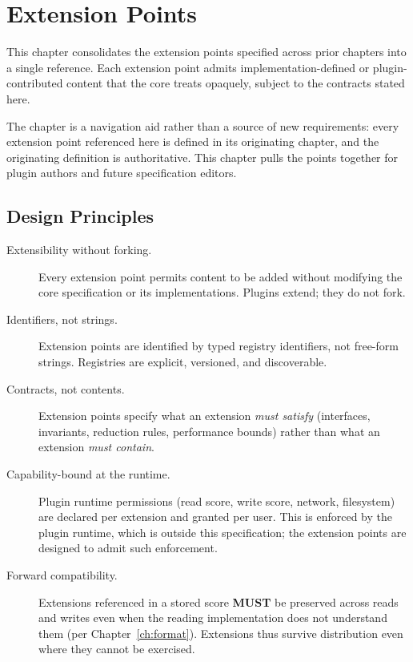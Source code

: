 \documentclass[11pt,letterpaper]{report}
\newcounter{requirement}[chapter]
\newcommand{\MUST}{\textbf{MUST}}
\begin{document}
\chapter{Extension Points}
\label{ch:extension}

This chapter consolidates the extension points specified across
prior chapters into a single reference. Each extension point admits
implementation-defined or plugin-contributed content that the core
treats opaquely, subject to the contracts stated here.

The chapter is a navigation aid rather than a source of new
requirements: every extension point referenced here is defined in
its originating chapter, and the originating definition is
authoritative. This chapter pulls the points together for plugin
authors and future specification editors.

\section{Design Principles}
\label{sec:ext:principles}

\begin{description}
  \item[Extensibility without forking.] Every extension point
    permits content to be added without modifying the core
    specification or its implementations. Plugins extend; they do
    not fork.
  \item[Identifiers, not strings.] Extension points are identified
    by typed registry identifiers, not free-form strings. Registries
    are explicit, versioned, and discoverable.
  \item[Contracts, not contents.] Extension points specify what an
    extension \emph{must satisfy} (interfaces, invariants, reduction
    rules, performance bounds) rather than what an extension
    \emph{must contain}.
  \item[Capability-bound at the runtime.] Plugin runtime
    permissions (read score, write score, network, filesystem) are
    declared per extension and granted per user. This is enforced
    by the plugin runtime, which is outside this specification; the
    extension points are designed to admit such enforcement.
  \item[Forward compatibility.] Extensions referenced in a stored
    score \MUST{} be preserved across reads and writes even when the
    reading implementation does not understand them (per
    Chapter~\ref{ch:format}). Extensions thus survive distribution
    even where they cannot be exercised.
\end{description}
\end{document}
